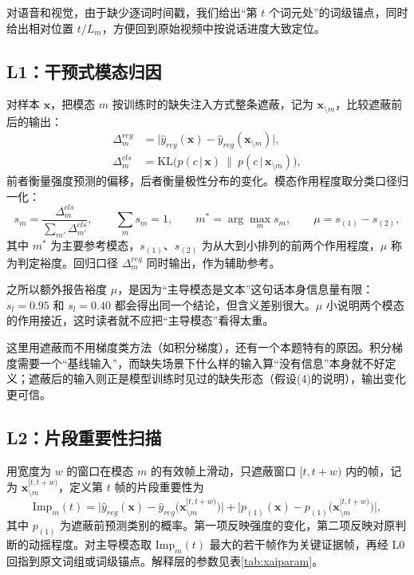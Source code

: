 对语音和视觉，由于缺少逐词时间戳，我们给出“第 $t$ 个词元处”的词级锚点，同时给出相对位置 $t/L_m$，方便回到原始视频中按说话进度大致定位。

\subsection{L1：干预式模态归因}

对样本 $\mathbf{x}$，把模态 $m$ 按训练时的缺失注入方式整条遮蔽，记为 $\mathbf{x}_{\setminus m}$，比较遮蔽前后的输出：
\begin{align}
\Delta_m^{reg}&=\big|\hat y_{reg}(\mathbf{x})-\hat y_{reg}(\mathbf{x}_{\setminus m})\big|,\label{eq:dreg}\\
\Delta_m^{cls}&=\mathrm{KL}\Big(p(c\,|\,\mathbf{x})\ \big\|\ p(c\,|\,\mathbf{x}_{\setminus m})\Big),\label{eq:dcls}
\end{align}
前者衡量强度预测的偏移，后者衡量极性分布的变化。模态作用程度取分类口径归一化：
\begin{equation}\label{eq:share}
s_m=\frac{\Delta_m^{cls}}{\sum_{m'}\Delta_{m'}^{cls}},\qquad \sum_m s_m=1,\qquad
m^{*}=\arg\max_m s_m,\qquad \mu=s_{(1)}-s_{(2)},
\end{equation}
其中 $m^*$ 为主要参考模态，$s_{(1)}$、$s_{(2)}$ 为从大到小排列的前两个作用程度，$\mu$ 称为判定裕度。回归口径 $\Delta_m^{reg}$ 同时输出，作为辅助参考。

之所以额外报告裕度 $\mu$，是因为“主导模态是文本”这句话本身信息量有限：$s_l=0.95$ 和 $s_l=0.40$ 都会得出同一个结论，但含义差别很大。$\mu$ 小说明两个模态的作用接近，这时读者就不应把“主导模态”看得太重。

这里用遮蔽而不用梯度类方法（如积分梯度\cite{sundararajan2017ig}），还有一个本题特有的原因。积分梯度需要一个“基线输入”，而缺失场景下什么样的输入算“没有信息”本身就不好定义；遮蔽后的输入则正是模型训练时见过的缺失形态（假设(4)的说明），输出变化更可信。

\subsection{L2：片段重要性扫描}

用宽度为 $w$ 的窗口在模态 $m$ 的有效帧上滑动，只遮蔽窗口 $[t,t+w)$ 内的帧，记为 $\mathbf{x}^{[t,t+w)}_{\setminus m}$，定义第 $t$ 帧的片段重要性为
\begin{equation}\label{eq:imp}
\mathrm{Imp}_m(t)=\Big|\hat y_{reg}(\mathbf{x})-\hat y_{reg}\big(\mathbf{x}^{[t,t+w)}_{\setminus m}\big)\Big|
+\Big|p_{(1)}(\mathbf{x})-p_{(1)}\big(\mathbf{x}^{[t,t+w)}_{\setminus m}\big)\Big|,
\end{equation}
其中 $p_{(1)}$ 为遮蔽前预测类别的概率。第一项反映强度的变化，第二项反映对原判断的动摇程度。对主导模态取 $\mathrm{Imp}_m(t)$ 最大的若干帧作为关键证据帧，再经 L0 回指到原文词组或词级锚点。解释层的参数见表\ref{tab:xaiparam}。

